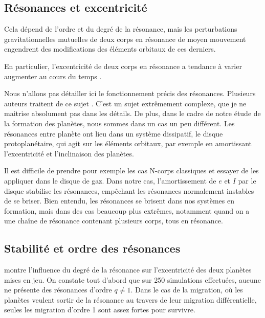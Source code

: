 \subsection{Résonances et excentricité}
Cela dépend de l'ordre et du degré de la résonance, mais les perturbations gravitationnelles mutuelles de deux corps en
résonance de moyen mouvement engendrent des modifications des éléments orbitaux de ces derniers. 

En particulier, l'excentricité de deux corps en résonance a tendance à varier augmenter au cours du temps \citep[eq.
(8.29)]{murray2000solar}. 

Nous n'allons pas détailler ici le fonctionnement précis des résonances. Plusieurs auteurs traitent de ce sujet
\citep{greenberg1977orbit, peale1986orbital, malhotra1988phd}. C'est un sujet extrêmement complexe, que je ne maitrise
absolument pas dans les détails. De plus, dans le cadre de notre étude de la formation des planètes, nous sommes dans un cas un
peu différent. Les résonances entre planète ont lieu dans un système dissipatif, le disque protoplanétaire, qui agit sur les
éléments orbitaux, par exemple en amortissant l'excentricité et l'inclinaison des planètes.

Il est difficile de prendre pour exemple les cas N-corps classiques et essayer de les appliquer dans le disque de gaz. Dans
notre cas, l'amortissement de $e$ et $I$ par le disque stabilise les résonances, empêchant les résonances normalement instables
de se briser. Bien entendu, les résonances se brisent dans nos systèmes en formation, mais dans des cas beaucoup plus extrêmes,
notamment quand on a une chaîne de résonance contenant plusieurs corps, tous en résonance. 

\subsection{Stabilité et ordre des résonances}
 montre l'influence du degré de la résonance sur l'excentricité des deux planètes mises en jeu. On
constate tout d'abord que sur 250 simulations effectuées, aucune ne présente des résonances d'ordre $q\neq 1$. Dans le cas de la
migration, où les planètes veulent sortir de la résonance au travers de leur migration différentielle, seules les migration
d'ordre 1 sont assez fortes pour survivre. 


